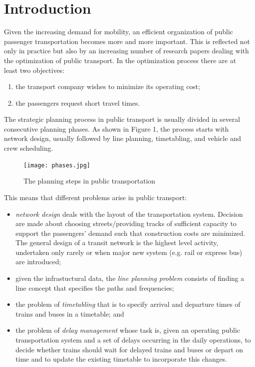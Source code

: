 \documentclass[
  twoside,
  11pt, a4paper,
  footinclude=true,
  headinclude=true,
  cleardoublepage=empty
]{scrbook}
\theoremstyle{definition}
\begin{document}
\chapter{Introduction}
Given the increasing demand for mobility,\cite{bringhurst:elementi} an efficient organization of public passenger transportation becomes more and more important. This is reflected not only in practice but also by an increasing number of research papers dealing with the optimization of public transport. In the optimization process there are at least two objectives:
\begin{enumerate}
\item the transport company wishes to minimize its operating cost;
\item the passengers request short travel times.
\end{enumerate}
The strategic planning process in public transport is usually divided in several consecutive planning phases. As shown in Figure 1, the process starts with network design, usually followed by line planning, timetabling, and vehicle and crew scheduling.
\begin{figure}[htbp]
\centering
\texttt{[image: phases.jpg]}%
\caption{\small The planning steps in public transportation}
\end{figure}
This means that different problems arise in public transport: 
\begin{itemize}
\item \emph{network design} deals with the layout of the transportation system. Decision are made about choosing streets/providing tracks of sufficient capacity to support the passengers' demand such that construction costs are minimized. The general design of a transit network is the highest level activity, undertaken only rarely or when major new system (e.g. rail or express bus) are introduced;
\item given the infrastuctural data, the \emph{line planning problem} consists of finding a line concept that specifies the paths and frequencies;
\item the problem of \emph{timetabling} that is to specify arrival and departure times of trains and buses  in a timetable; and
\item the problem of \emph{delay management} whose task is, given an operating public transportation system and a set of delays occurring in the daily operations, to decide whether trains should wait for delayed trains and buses or depart on time and to update the existing timetable to incorporate this changes.
\end{itemize}
\end{document}
